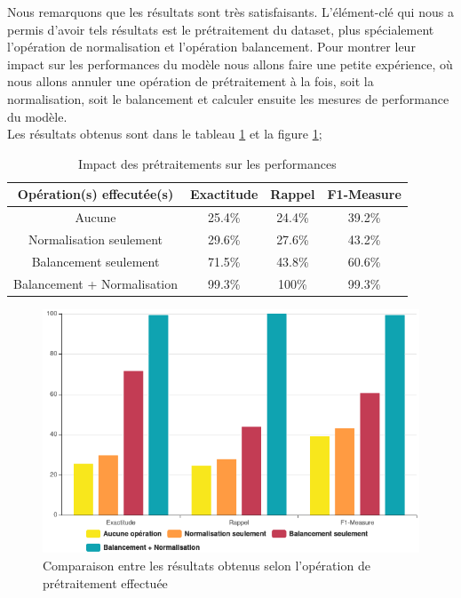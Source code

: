 Nous remarquons que les résultats sont très satisfaisants. L'élément-clé qui nous a permis d'avoir tels résultats est le prétraitement du dataset, plus spécialement l'opération de normalisation et l'opération balancement. Pour montrer leur impact sur les performances du modèle nous allons faire une petite expérience, où nous allons annuler une opération de prétraitement à la fois, soit la normalisation, soit le balancement et calculer ensuite les mesures de performance du modèle.\\

\noindent Les résultats obtenus sont dans le tableau \ref{table:compare} et la figure \ref{fig:histogramme};
\begin{table}[h]
	\begin{center}
		\begin{tabular}{  | c | c | c | c | }
			\hline
			 Opération(s) effecutée(s) & Exactitude & Rappel & F1-Measure \\
			\hline
			\hline
			Aucune & 25.4\% & 24.4\% & 39.2\% \\
			\hline
			Normalisation seulement & 29.6\% & 27.6\% & 43.2\% \\
			\hline
			Balancement seulement & 71.5\% & 43.8\% & 60.6\% \\
			\hline
			\rowcolor[rgb]{0.9,0.70,0.70}
			Balancement + Normalisation & 99.3\% & 100\% & 99.3\% \\
			\hline
		\end{tabular}
		\caption{Impact des prétraitements sur les performances}
		\label{table:compare}
	\end{center}	
\end{table}

\begin{figure}[H]
\centering
\includegraphics[width=\textwidth]{Figures/performances}
\decoRule
\caption{Comparaison entre les résultats obtenus selon l'opération de prétraitement effectuée}
\label{fig:histogramme}
\end{figure} 

